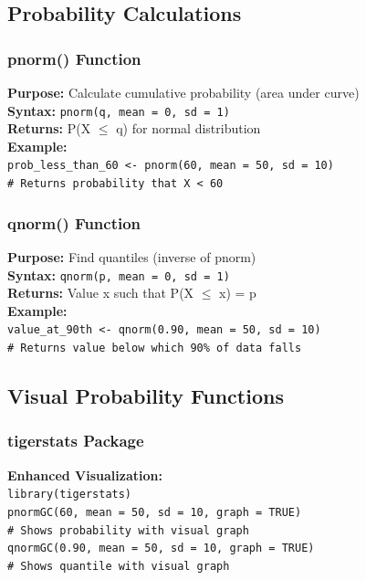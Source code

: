 \documentclass[11pt,a4paper]{article}
\begin{document}
\subsection{Probability Calculations}

\subsubsection{pnorm() Function}

\begin{formulabox}
\textbf{Purpose:} Calculate cumulative probability (area under curve)\\[0.3cm]
\textbf{Syntax:} \texttt{pnorm(q, mean = 0, sd = 1)}\\[0.3cm]
\textbf{Returns:} P(X $\leq$ q) for normal distribution\\[0.3cm]
\textbf{Example:}\\
\texttt{prob\_less\_than\_60 <- pnorm(60, mean = 50, sd = 10)}\\
\texttt{\# Returns probability that X < 60}
\end{formulabox}

\subsubsection{qnorm() Function}

\begin{formulabox}
\textbf{Purpose:} Find quantiles (inverse of pnorm)\\[0.3cm]
\textbf{Syntax:} \texttt{qnorm(p, mean = 0, sd = 1)}\\[0.3cm]
\textbf{Returns:} Value x such that P(X $\leq$ x) = p\\[0.3cm]
\textbf{Example:}\\
\texttt{value\_at\_90th <- qnorm(0.90, mean = 50, sd = 10)}\\
\texttt{\# Returns value below which 90\% of data falls}
\end{formulabox}

\subsection{Visual Probability Functions}

\subsubsection{tigerstats Package}

\begin{formulabox}
\textbf{Enhanced Visualization:}\\
\texttt{library(tigerstats)}\\[0.3cm]
\texttt{pnormGC(60, mean = 50, sd = 10, graph = TRUE)}\\
\texttt{# Shows probability with visual graph}\\[0.3cm]
\texttt{qnormGC(0.90, mean = 50, sd = 10, graph = TRUE)}\\
\texttt{# Shows quantile with visual graph}
\end{formulabox}
\end{document}
